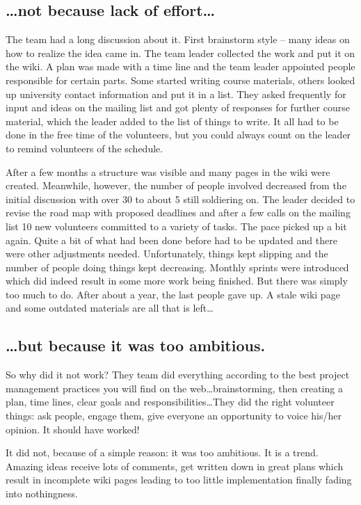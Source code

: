 \subsection*{\dots not because lack of effort\dots}
The team had a long discussion about it. First brainstorm style -- many ideas on how to realize the idea came in. The team leader collected the work and put it on the wiki. A plan was made with a time line and the team leader appointed people responsible for certain parts. Some started writing  course materials, others looked up university contact information and put it in a list. They asked frequently for input and ideas on the mailing list and got plenty of responses for further course material, which the leader added to the list of things to write. It all had to be done in the free time of the volunteers, but you could always count on the leader to remind volunteers of the schedule.

After a few months a structure was visible and many pages in the wiki were created. Meanwhile, however, the number of people involved decreased from the initial discussion with over 30 to about 5 still soldiering on. The leader decided to revise the road map with proposed deadlines and after a few calls on the mailing list 10 new volunteers committed to a variety of tasks. The pace picked up a bit again. Quite a bit of what had been done before had to be updated and there were other adjustments needed. Unfortunately, things kept slipping and the number of people doing things kept decreasing. Monthly sprints were introduced which did indeed result in some more work being finished. But there was simply too much to do. After about a year, the last people gave up. A stale wiki page and some outdated materials are all that is left\dots

\subsection*{\dots but because it was too ambitious.}
So why did it not work? They team did everything according to the best project management practices you will find on the web\dots brainstorming, then creating a plan, time lines, clear goals and responsibilities\dots They did the right volunteer things: ask people, engage them, give everyone an opportunity to voice his/her opinion. It should have worked!

It did not, because of a simple reason: it was too ambitious. It is a trend. Amazing ideas receive lots of comments, get written down in great plans which result in incomplete wiki pages leading to too little implementation finally fading into nothingness.

